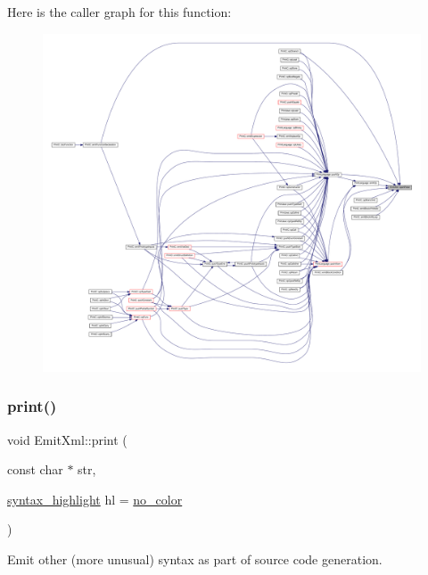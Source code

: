 Here is the caller graph for this function\+:
\nopagebreak
\begin{figure}[H]
\begin{center}
\leavevmode
\includegraphics[width=350pt]{class_emit_xml_a4f7e781436dde8754ae5f52c9c5edc47_icgraph}
\end{center}
\end{figure}
\mbox{\label{class_emit_xml_a287234536199377d46179762127875ac}} 
\subsubsection{\texorpdfstring{print()}{print()}}
{\footnotesize\ttfamily void Emit\+Xml\+::print (\begin{DoxyParamCaption}\item[{const char $\ast$}]{str,  }\item[{\mbox{\hyperlink{class_emit_xml_a7c3577436da429c3c75f4b82cac6864f}{syntax\+\_\+highlight}}}]{hl = {\ttfamily \mbox{\hyperlink{class_emit_xml_a7c3577436da429c3c75f4b82cac6864facf637f33b975ebd31bda638a66d5b052}{no\+\_\+color}}} }\end{DoxyParamCaption})\hspace{0.3cm}{\ttfamily [virtual]}}



Emit other (more unusual) syntax as part of source code generation. 

